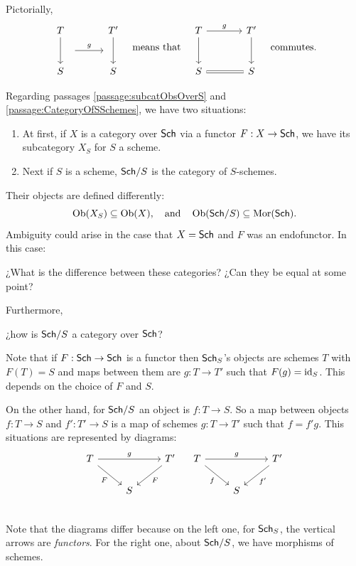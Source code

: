 \documentclass[12pt]{memoir}
\newcounter{passage}
\begin{document}
Pictorially,
$$
\begin{tikzcd}[row sep=large, column sep=large]
T \arrow[d, ""{name=L}] & T' \arrow[d, ""{name=R}] \\
S & S
\arrow[from=L, to=R, "g", shorten <=1em, shorten >=1em]
\end{tikzcd}
\quad\text{means that}\quad
\begin{tikzcd}[row sep=large, column sep=large]
T \arrow[r, "g"] \arrow[d] & T' \arrow[d] \\
S \arrow[r, equal] & S
\end{tikzcd}
\quad\text{commutes.}
$$

\begin{ptcb}
    Regarding passages \ref{passage:subcatObsOverS} and \ref{passage:CategoryOfSSchemes}, we have two situations:
    \begin{enumerate}
        \item At first, if \(X\) is a category over \(\mathsf{Sch}\) via a functor \(F:X\to\mathsf{Sch}\), we have its subcategory \(X_S\) for \(S\) a scheme.
        \item Next if \(S\) is a scheme, \(\mathsf{Sch}/S\) is the category of \(S\)-schemes.
    \end{enumerate}
    Their objects are defined differently:
    \[
    \operatorname{Ob}(X_S)\subseteq\operatorname{Ob}(X),\quad\text{and}\quad\operatorname{Ob}(\mathsf{Sch}/S)\subseteq\operatorname{Mor}(\mathsf{Sch}).
    \]
    Ambiguity could arise in the case that \(X=\mathsf{Sch}\) and \(F\) was an endofunctor. In this case:
    \begin{Qn}
        ¿What is the difference between these categories? ¿Can they be equal at some point?
    \end{Qn}
    Furthermore,
    \begin{Qn}
        ¿how is \(\mathsf{Sch}/S\) a category over \(\mathsf{Sch}\)?
    \end{Qn}
\tcbline
Note that if \(F:\mathsf{Sch}\to\mathsf{Sch}\) is a functor then \(\mathsf{Sch}_S\)'s objects are schemes \(T\) with \(F(T)=S\) and maps between them are \(g:T\to T'\) such that \(F(g)=\operatorname{id}_S\). This depends on the choice of \(F\) and \(S\).\par
On the other hand, for \(\mathsf{Sch}/S\) an object is \(f:T\to S\). So a map between objects \(f:T\to S\) and \(f':T'\to S\) is a map of schemes \(g:T\to T'\) such that \(f=f'g\). This situations are represented by diagrams:
\[
\begin{tikzcd}
 T\arrow[dr,"F"'] \arrow[rr,"g"] && T'\arrow[dl,"F"] \\
& S  \\
\end{tikzcd}
\quad
\begin{tikzcd}
 T\arrow[dr,"f"'] \arrow[rr,"g"] && T'\arrow[dl,"f'"] \\
& S  \\
\end{tikzcd}
\]
Note that the diagrams differ because on the left one, for \(\mathsf{Sch}_S\), the vertical arrows are \emph{functors}. For the right one, about \(\mathsf{Sch}/S\), we have morphisms of schemes.


\end{ptcb}
\end{document}
